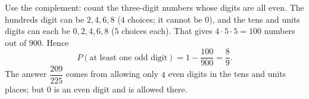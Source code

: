 Use the complement: count the three-digit numbers whose digits are all even. The hundreds digit can be $2,4,6,8$ ($4$ choices; it cannot be $0$), and the tens and units digits can each be $0,2,4,6,8$ ($5$ choices each). That gives $4\cdot5\cdot5=100$ numbers out of $900$. Hence
\[
P(\text{at least one odd digit})=1-\dfrac{100}{900}=\boxed{\dfrac{8}{9}}.
\]
The answer $\dfrac{209}{225}$ comes from allowing only $4$ even digits in the tens and units places; but $0$ is an even digit and is allowed there.
